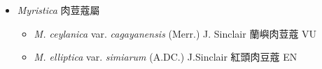 
  \begin{itemize}
 \item[] \textit{Myristica} 肉荳蔻屬
                                
  \begin{itemize}
        \item[] \textit{M. ceylanica} var. \textit{cagayanensis} (Merr.) J. Sinclair  蘭嶼肉荳蔻   VU
        \item[] \textit{M. elliptica} var. \textit{simiarum} (A.DC.) J.Sinclair  紅頭肉豆蔻   EN
  \end{itemize}
  \end{itemize}
